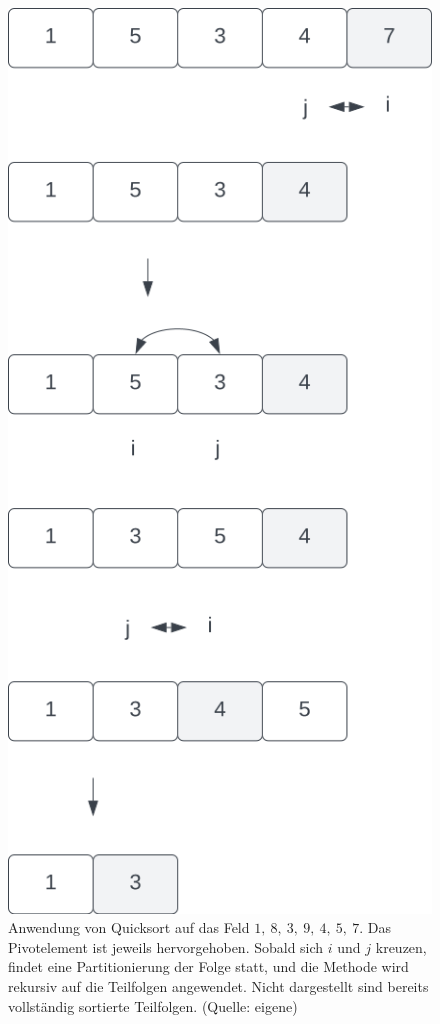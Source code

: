\begin{figure}
\begin{center}
    \end{center}
    \begin{center}
        \includegraphics[scale=0.3]{chapters/Sortierverfahren/img/quicksort2}
        \caption{Anwendung von Quicksort auf das Feld $1,\ 8,\ 3,\ 9,\ 4,\ 5,\ 7$. Das Pivotelement ist jeweils hervorgehoben. Sobald sich $i$ und $j$ kreuzen, findet eine Partitionierung der Folge statt, und die Methode wird rekursiv auf die Teilfolgen angewendet. Nicht dargestellt sind bereits vollständig sortierte Teilfolgen. (Quelle: eigene)}
        \label{fig:quicksort}
    \end{center}
\end{figure}


